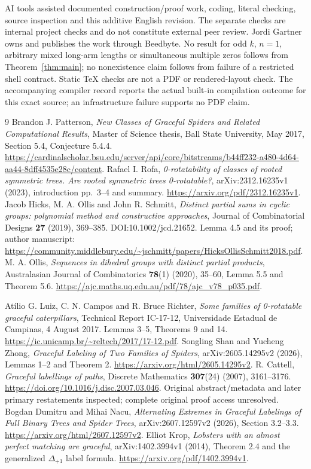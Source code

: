 \documentclass[11pt,a4paper]{article}
\theoremstyle{definition}\newtheorem{definition}[theorem]{Definition}
\theoremstyle{remark}\newtheorem{remark}[theorem]{Remark}
\begin{document}
AI tools assisted documented construction/proof work, coding, literal
checking, source inspection and this additive English revision. The
separate checks are internal project checks and do not constitute
external peer review. Jordi Gartner owns and publishes the work through
Beedbyte. No result for
odd $k$, $n=1$, arbitrary mixed long-arm lengths or simultaneous
multiple zeros follows from Theorem~\ref{thm:main}; no nonexistence
claim follows from failure of a restricted shell contract.
Static TeX checks are not a PDF or rendered-layout check. The accompanying
compiler record reports the actual built-in compilation outcome for
this exact source; an infrastructure failure supports no PDF claim.

\begin{thebibliography}{9}
 Brandon J. Patterson,
\emph{New Classes of Graceful Spiders and Related Computational Results},
Master of Science thesis, Ball State University, May 2017, Section 5.4,
Conjecture 5.4.4.
\url{https://cardinalscholar.bsu.edu/server/api/core/bitstreams/b44ff232-a480-4d64-aa44-8dff4535e28c/content}.
 Rafael I. Rofa,
\emph{0-rotatability of classes of rooted symmetric trees. Are rooted
symmetric trees 0-rotatable?}, arXiv:2312.16235v1 (2023), introduction
pp.~3--4 and summary.
\url{https://arxiv.org/pdf/2312.16235v1}.
 Jacob Hicks, M. A. Ollis and John R. Schmitt,
\emph{Distinct partial sums in cyclic groups: polynomial method and
constructive approaches}, Journal of Combinatorial Designs
\textbf{27} (2019), 369--385. DOI:10.1002/jcd.21652.
Lemma 4.5 and its proof; author manuscript:
\url{https://community.middlebury.edu/~jschmitt/papers/HicksOllisSchmitt2018.pdf}.
 M. A. Ollis,
\emph{Sequences in dihedral groups with distinct partial products},
Australasian Journal of Combinatorics \textbf{78}(1) (2020), 35--60,
Lemma 5.5 and Theorem 5.6.
\url{https://ajc.maths.uq.edu.au/pdf/78/ajc_v78_p035.pdf}.

 At\'{i}lio G. Luiz, C. N. Campos and R. Bruce Richter,
\emph{Some families of 0-rotatable graceful caterpillars},
Technical Report IC-17-12, Universidade Estadual de Campinas,
4 August 2017. Lemmas 3--5, Theorems 9 and 14.
\url{https://ic.unicamp.br/~reltech/2017/17-12.pdf}.
 Songling Shan and Yucheng Zhong,
\emph{Graceful Labeling of Two Families of Spiders},
arXiv:2605.14295v2 (2026), Lemmas 1--2 and Theorem 2.
\url{https://arxiv.org/html/2605.14295v2}.
 R. Cattell,
\emph{Graceful labellings of paths}, Discrete Mathematics
\textbf{307}(24) (2007), 3161--3176.
\url{https://doi.org/10.1016/j.disc.2007.03.046}.
Original abstract/metadata and later primary restatements inspected;
complete original proof access unresolved.
 Bogdan Dumitru and Mihai Nacu,
\emph{Alternating Extremes in Graceful Labelings of Full Binary Trees
and Spider Trees}, arXiv:2607.12597v2 (2026), Section 3.2--3.3.
\url{https://arxiv.org/html/2607.12597v2}.
 Elliot Krop,
\emph{Lobsters with an almost perfect matching are graceful},
arXiv:1402.3994v1 (2014), Theorem 2.4 and the generalized
$\Delta_{+1}$ label formula.
\url{https://arxiv.org/pdf/1402.3994v1}.


\end{thebibliography}
\end{document}

